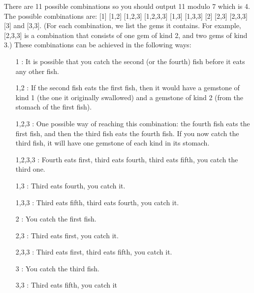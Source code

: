 There are 11 possible combinations so you should output 11 modulo 7 which is 4.
The possible combinations are: [1] [1,2] [1,2,3] [1,2,3,3] [1,3] [1,3,3] [2] [2,3] [2,3,3] [3] and [3,3]. (For each combination, we list the gems it contains. For example, [2,3,3] is a combination that consists of one gem of kind 2, and two gems of kind 3.)
These combinations can be achieved in the following ways:
\begin{itemize}
\item [1]: It is possible that you catch the second (or the fourth) fish before it eats any other fish.  
\item [1,2]: If the second fish eats the first fish, then it would have a gemstone of kind 1 (the one it originally swallowed) and a gemstone of kind 2 (from the stomach of the first fish).
\item [1,2,3]: One possible way of reaching this combination: the fourth fish eats the first fish, and then the third fish eats the fourth fish. If you now catch the third fish, it will have one gemstone of each kind in its stomach.
\item [1,2,3,3]: Fourth eats first, third eats fourth, third eats fifth, you catch the third one.
\item [1,3]: Third eats fourth, you catch it.
\item [1,3,3]: Third eats fifth, third eats fourth, you catch it.
\item [2]: You catch the first fish.
\item [2,3]: Third eats first, you catch it.
\item [2,3,3]: Third eats first, third eats fifth, you catch it.
\item [3]: You catch the third fish.
\item [3,3]: Third eats fifth, you catch it
\end{itemize}
